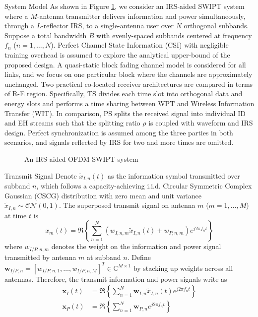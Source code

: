 \documentclass{IEEEtran}
\begin{document}
\begin{section}{System Model}
	As shown in Figure \ref{fi:system}, we consider an IRS-aided SWIPT system where a $M$-antenna transmitter delivers information and power simultaneously, through a $L$-reflector IRS, to a single-antenna user over $N$ orthogonal subbands. Suppose a total bandwidth $B$ with evenly-spaced subbands centered at frequency $f_n$ ($n=1,\dots,N$). Perfect Channel State Information (CSI) with negligible training overhead is assumed to explore the analytical upper-bound of the proposed design. A quasi-static block fading channel model is considered for all links, and we focus on one particular block where the channels are approximately unchanged. Two practical co-located receiver architectures are compared in terms of R-E region. Specifically, TS divides each time slot into orthogonal data and energy slots and performs a time sharing between WPT and Wireless Information Transfer (WIT). In comparison, PS splits the received signal into individual ID and EH streams such that the splitting ratio $\rho$ is coupled with waveform and IRS design. Perfect synchronization is assumed among the three parties in both scenarios, and signals reflected by IRS for two and more times are omitted.

	\begin{figure}
		\centering
		\def\svgwidth{\columnwidth}
		
		\caption{An IRS-aided OFDM SWIPT system}
		\label{fi:system}
	\end{figure}

	\begin{subsection}{Transmit Signal}
		Denote $\tilde{x}_{I,n}(t)$ as the information symbol transmitted over subband $n$, which follows a capacity-achieving i.i.d. Circular Symmetric Complex Gaussian (CSCG) distribution with zero mean and unit variance $\tilde{x}_{I,n}\sim\mathcal{CN}(0,1)$. The superposed transmit signal on antenna $m$ ($m=1,\dots,M$) at time $t$ is
		\begin{equation}\label{eq:x_m}
			x_m(t)=\Re\left\{\sum_{n=1}^N\left({w_{I,n,m}\tilde{x}_{I,n}(t)}+w_{P,n,m}\right){e^{j2{\pi}{f_n}{t}}}\right\}
		\end{equation}
		where $w_{I/P,n,m}$ denotes the weight on the information and power signal transmitted by antenna $m$ at subband $n$. Define $\boldsymbol{w}_{I/P,n}=[w_{I/P,n,1},\dots,w_{I/P,n,M}]^T \in \mathbb{C}^{M \times 1}$ by stacking up weights across all antennas. Therefore, the transmit information and power signals write as
		\begin{align}
			\boldsymbol{x}_{I}(t) &= \Re{\left\{\sum_{n=1}^N\boldsymbol{w}_{I,n}\tilde{x}_{I,n}(t){e^{j2{\pi}{f_n}{t}}}\right\}}\label{eq:x_I}\\
			\boldsymbol{x}_{P}(t) &= \Re{\left\{\sum_{n=1}^N\boldsymbol{w}_{P,n}{e^{j2{\pi}{f_n}{t}}}\right\}}\label{eq:x_P}
		\end{align}
	\end{subsection}


\end{section}
\end{document}
